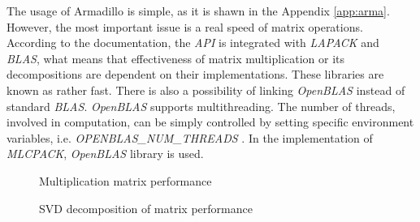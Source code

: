 The usage of Armadillo is simple, as it is shawn in the Appendix \ref{app:arma}. However, the most important issue is a real speed of matrix operations. According to the documentation, the \textit{API} is integrated with \textit{LAPACK} and \textit{BLAS}, what means that effectiveness of matrix multiplication or its decompositions are dependent on their implementations. These libraries are known as rather fast. There is also a possibility of linking \textit{OpenBLAS} instead of standard \textit{BLAS}. \textit{OpenBLAS} supports multithreading. The number of threads, involved in computation, can be simply controlled by setting specific environment variables, i.e. \textit{OPENBLAS\_NUM\_THREADS} \cite{Blas}. In the implementation of \textit{MLCPACK}, \textit{OpenBLAS} library is used.    

\begin{figure}[h]
\centering
\caption{Multiplication matrix performance}
\label{fig:mulperf}
\end{figure}

\begin{figure}
\centering
\caption{SVD decomposition of matrix performance}
\label{fig:svdperf}
\end{figure}


